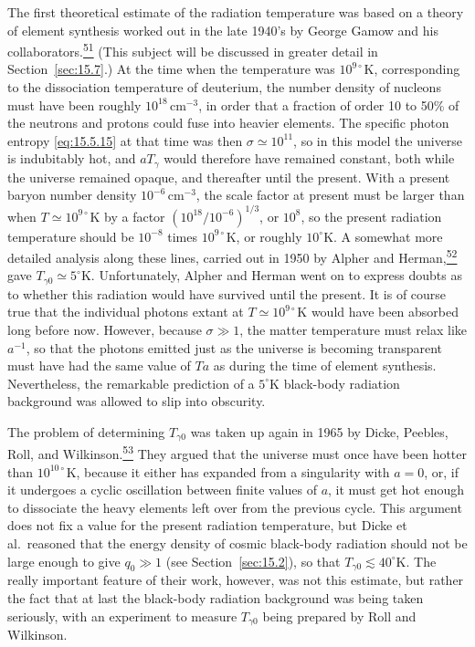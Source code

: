 The first theoretical estimate of the radiation temperature was based on a
theory of element synthesis worked out in the late 1940's by George Gamow and
his collaborators.\hyperref[ch15-ref-51]{\textsuperscript{51}} (This subject
will be discussed in greater detail in Section~\ref{sec:15.7}.) At the time
when the temperature was \(10^{9\circ}\mathrm{K}\), corresponding to the
dissociation temperature of deuterium, the number density of nucleons must have
been roughly \(10^{18}\,\mathrm{cm^{-3}}\), in order that a fraction of order
10 to 50\% of the neutrons and protons could fuse into heavier elements. The
specific photon entropy \eqref{eq:15.5.15} at that time was then
\(\sigma\simeq10^{11}\), so in this model the universe is indubitably hot,
and \(aT_\gamma\) would therefore have remained constant, both while the
universe remained opaque, and thereafter until the present. With a present
baryon number density \(10^{-6}\,\mathrm{cm^{-3}}\), the scale factor at
present must be larger than when \(T\simeq10^{9\circ}\mathrm{K}\) by a factor
\((10^{18}/10^{-6})^{1/3}\), or \(10^8\), so the present radiation
temperature should be \(10^{-8}\) times \(10^{9\circ}\mathrm{K}\), or roughly
\(10^\circ\mathrm{K}\). A somewhat more detailed analysis along these lines,
carried out in 1950 by Alpher and
Herman,\hyperref[ch15-ref-52]{\textsuperscript{52}} gave
\(T_{\gamma0}\simeq5^\circ\mathrm{K}\). Unfortunately, Alpher and Herman went
on to express doubts as to whether this radiation would have survived until the
present. It is of course true that the individual photons extant at
\(T\simeq10^{9\circ}\mathrm{K}\) would have been absorbed long before now.
However, because \(\sigma\gg1\), the matter temperature must relax like
\(a^{-1}\), so that the photons emitted just as the universe is becoming
transparent must have had the same value of \(Ta\) as during the time of
element synthesis. Nevertheless, the remarkable prediction of a
\(5^\circ\mathrm{K}\) black-body radiation background was allowed to slip
into obscurity.

The problem of determining \(T_{\gamma0}\) was taken up again in 1965 by
Dicke, Peebles, Roll, and
Wilkinson.\hyperref[ch15-ref-53]{\textsuperscript{53}} They argued that the
universe must once have been hotter than \(10^{10\circ}\mathrm{K}\), because
it either has expanded from a singularity with \(a=0\), or, if it undergoes a
cyclic oscillation between finite values of \(a\), it must get hot enough to
dissociate the heavy elements left over from the previous cycle. This argument
does not fix a value for the present radiation temperature, but Dicke et al.\
reasoned that the energy density of cosmic black-body radiation should not be
large enough to give \(q_0\gg1\) (see Section~\ref{sec:15.2}), so that
\(T_{\gamma0}\lesssim40^\circ\mathrm{K}\). The really important feature of
their work, however, was not this estimate, but rather the fact that at last
the black-body radiation background was being taken seriously, with an
experiment to measure \(T_{\gamma0}\) being prepared by Roll and Wilkinson.

